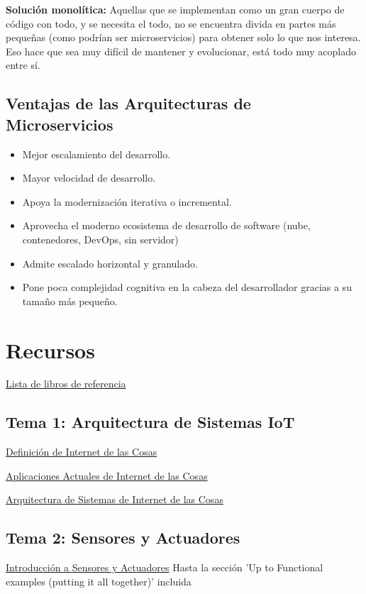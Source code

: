 \documentclass[12pt]{report} %
\begin{document}
\textbf{Solución monolítica:} Aquellas que se implementan como un gran cuerpo de código con todo,  y se necesita el todo, no se encuentra divida en partes más pequeñas (como podrían ser microservicios) para obtener solo lo que nos interesa. Eso hace que sea muy difícil de mantener y evolucionar, está todo muy acoplado entre sí.

\section{Ventajas de las Arquitecturas de Microservicios}
\begin{itemize}
	\item	Mejor escalamiento del desarrollo.
	\item	Mayor velocidad de desarrollo.
	\item	Apoya la modernización iterativa o incremental.
	\item	Aprovecha el moderno ecosistema de desarrollo de software (nube, contenedores, DevOps, sin servidor)
	\item	Admite escalado horizontal y granulado.
	\item	Pone poca complejidad cognitiva en la cabeza del desarrollador gracias a su tamaño más pequeño.
\end{itemize}

\chapter{Recursos}
\href{https://learning.oreilly.com/playlists/5a6c045f-e39c-465e-9e7c-60dcbb12aebb}{Lista de libros de referencia}

\section{Tema 1: Arquitectura de Sistemas IoT}
\href{https://learning.oreilly.com/library/view/internet-of-things/9781788470599/a7f866bd-4ac8-47f3-a175-0f10d91a5ce2.xhtml}{Definición de Internet de las Cosas}

\href{https://learning.oreilly.com/library/view/internet-of-things/9781119456742/part04.xhtml\#part}{Aplicaciones Actuales de Internet de las Cosas}

\href{https://learning.oreilly.com/library/view/build-your-own/9781484244982/html/474034_1_En_2_Chapter.xhtml}{Arquitectura de Sistemas de Internet de las Cosas}

\section{Tema 2: Sensores y Actuadores}
\href{https://learning.oreilly.com/library/view/internet-of-things/9781788470599/d39be056-b166-476e-868e-c415e4dfa886.xhtml}{Introducción a Sensores y Actuadores} Hasta la sección 'Up to Functional examples (putting it all together)' incluida
\end{document}
